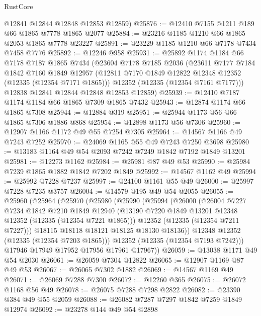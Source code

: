 \begin{lexlean}{RustCore}
\begin{coremodule}
      @12841
      @12844
      @12848
      @12853
      @12859)
@25876 := @12410 @7155 @1211 @189 @66 @1865 @7778 @1865 @2077
@25884 := @23216 @1185 @1210 @66 @1865 @2053 @1865 @7778 @23227
@25891 := @23229 @1185 @1210 @66 @7178 @7434 @7458 @7776
@25892 := @12246 @958
@25931 := @25892
    @1174
    @1184
    @66
    @7178
    @7187
    @1865
    @7434
    (@23604
      @7178
      @7185
      @2036
      (@23611
        @7177
        @7184
        @1842
        @7160
        @1849
        @12957
        (@12811 @7170 @1849 @12822 @12348 @12352 (@12335 (@12354 @7171 @1865)))
        @12352
        (@12335 (@12354 @7161 @7177)))
      @12838
      @12841
      @12844
      @12848
      @12853
      @12859)
@25939 := @12410 @7187 @1174 @1184 @66 @1865 @7309 @1865 @7432
@25943 := @12874 @1174 @66 @1865 @7308
@25944 := @12884 @319
@25951 := @25944 @1173 @56 @66 @1865 @7306 @1886 @868
@25954 := @12898 @1173 @56 @7306
@25960 := @12907 @1166 @1172 @49 @55 @7254 @7305
@25964 := @14567 @1166 @49 @7243 @7252
@25970 := @24069 @1165 @55 @49 @7243 @7250 @3698
@25980 := @13183 @1164 @49 @54 @2093 @7242 @7249 @1842 @7192 @1849 @13201
@25981 := @12273 @1162
@25984 := @25981 @87 @49 @53
@25990 := @25984 @7239 @1865 @1882 @1842 @7202 @1849
@25992 := @14567 @1162 @49
@25994 := @25992 @7228 @7237
@25997 := @24100 @1161 @55 @49
@26000 := @25997 @7228 @7235 @3757
@26004 := @14579 @195 @49 @54 @2055
@26055 := @25960
    (@25964
      (@25970
        (@25980
          (@25990
            (@25994
              (@26000
                (@26004
                  @7227
                  @7234
                  @1842
                  @7210
                  @1849
                  @12940
                  (@13190 @7220 @1849 @13201 @12348 @12352 (@12335 (@12354 @7221 @1865)))
                  @12352
                  (@12335 (@12354 @7211 @7227)))
                @18115
                @18118
                @18121
                @18125
                @18130
                @18136))
            @12348
            @12352
            (@12335 (@12354 @7203 @1865)))
          @12352
          (@12335 (@12354 @7193 @7242)))
        @17946
        @17949
        @17952
        @17956
        @17961
        @17967))
@26059 := @13038 @1171 @49 @54 @2030
@26061 := @26059 @7304 @12822
@26065 := @12907 @1169 @87 @49 @53
@26067 := @26065 @7302 @1882
@26069 := @14567 @1169 @49
@26071 := @26069 @7288 @7300
@26072 := @12260 @365
@26075 := @26072 @1168 @56 @49
@26078 := @26075 @7288 @7298 @2822
@26082 := @23390 @384 @49 @55 @2059
@26088 := @26082 @7287 @7297 @1842 @7259 @1849 @12974
@26092 := @23278 @144 @49 @54 @2898

\end{coremodule}
\end{lexlean}
